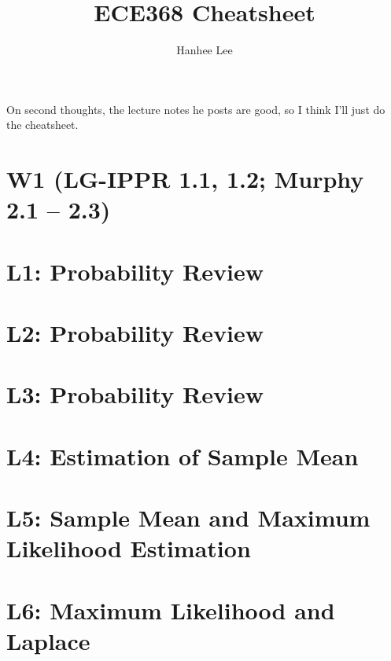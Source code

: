\documentclass[twoside]{article}
\title{ECE368 Cheatsheet}
\author{Hanhee Lee}
\begin{document}
\maketitle

\tableofcontents

\begin{summary}
    On second thoughts, the lecture notes he posts are good, so I think I'll just do the cheatsheet. 
\end{summary}
\section*{W1 (LG-IPPR 1.1, 1.2; Murphy 2.1 – 2.3)}
\section{L1: Probability Review}

\newpage

\section{L2: Probability Review}

\newpage

\section{L3: Probability Review}

\cleardoublepage

\section{L4: Estimation of Sample Mean}

\newpage

\section{L5: Sample Mean and Maximum Likelihood Estimation}

\newpage

\section{L6: Maximum Likelihood and Laplace}

\end{document}

